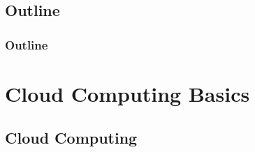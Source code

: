 \documentclass{beamer}
\begin{document}
\subsection*{Outline}

\begin{frame}
  \frametitle{Outline}
  \tableofcontents[hideallsubsections]
\end{frame}

\section[Cloud Computing]{Cloud Computing Basics}

\subsection{Cloud Computing}
\end{document}
